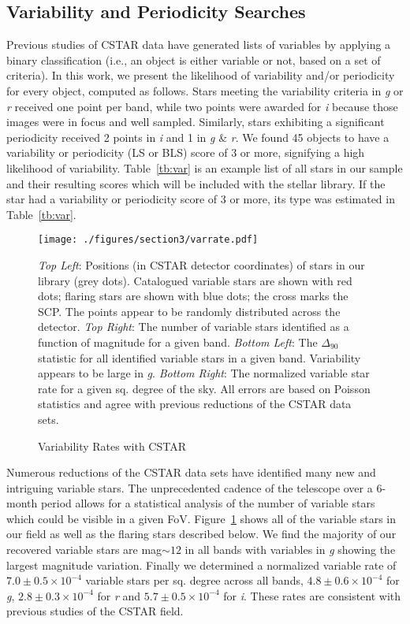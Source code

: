 \subsection{Variability and Periodicity Searches\label{subsec:lib}}
Previous studies of CSTAR data \citep{Wang2011, Wang2013, Oelkers2015, Yang2015} have generated lists of variables by applying a binary classification (i.e., an object is either variable or not, based on a set of criteria). In this work, we present the likelihood of variability and/or periodicity for every object, computed as follows. Stars meeting the variability criteria in \textit{g} or \textit{r} received one point per band, while two points were awarded for \textit{i} because those images were in focus and well sampled. Similarly, stars exhibiting a significant periodicity received 2 points in \textit{i} and 1 in \textit{g} \& \textit{r}. We found 45 objects to have a variability or periodicity (LS or BLS) score of 3 or more, signifying a high likelihood of variability. Table~\ref{tb:var} is an example list of all stars in our sample and their resulting scores which will be included with the stellar library. If the star had a variability or periodicity score of 3 or more, its type was estimated in Table~\ref{tb:var}.\\

\begin{figure}[H]
\begin{center}
\singlespace
\texttt{[image: ./figures/section3/varrate.pdf]}
\end{center}
\singlespace
\caption{Variability Rates with CSTAR}   \textit{Top Left}: Positions (in CSTAR detector coordinates) of stars in our library (grey dots). Catalogued variable stars are shown with red dots; flaring stars are shown with blue dots; the cross marks the SCP. The points appear to be randomly distributed across the detector. \textit{Top Right}: The number of variable stars identified as a function of magnitude for a given band. \textit{Bottom Left}: The $\Delta_{90}$ statistic for all identified variable stars in a given band. Variability appears to be large in \textit{g}. \textit{Bottom Right}: The normalized variable star rate for a given sq. degree of the sky. All errors are based on Poisson statistics and agree with previous reductions of the CSTAR data sets.\label{fig:varrate}
\end{figure}

Numerous reductions of the CSTAR data sets have identified many new and intriguing variable stars. The unprecedented cadence of the telescope over a 6-month period allows for a statistical analysis of the number of variable stars which could be visible in a given FoV. Figure~\ref{fig:varrate} shows all of the variable stars in our field as well as the flaring stars described below. We find the majority of our recovered variable stars are mag$\sim12$ in all bands with variables in \textit{g} showing the largest magnitude variation. Finally we determined a normalized variable rate of $7.0\pm0.5\times10^{-4}$ variable stars per sq. degree across all bands, $4.8\pm0.6\times10^{-4}$ for \textit{g}, $2.8\pm0.3\times10^{-4}$ for \textit{r} and $5.7\pm0.5\times10^{-4}$ for \textit{i}. These rates are consistent with previous studies of the CSTAR field.

